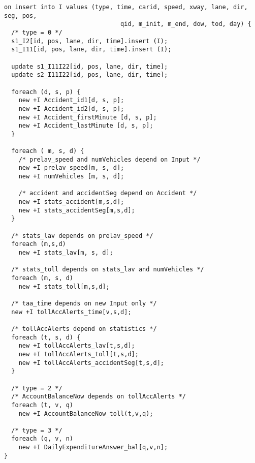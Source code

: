 \pagebreak
\begin{verbatim}
on insert into I values (type, time, carid, speed, xway, lane, dir, seg, pos, 
                                qid, m_init, m_end, dow, tod, day) {
  /* type = 0 */
  s1_I2[id, pos, lane, dir, time].insert (I);
  s1_I11[id, pos, lane, dir, time].insert (I);
  
  update s1_I11I22[id, pos, lane, dir, time];
  update s2_I11I22[id, pos, lane, dir, time];

  foreach (d, s, p) {
    new +I Accident_id1[d, s, p];
    new +I Accident_id2[d, s, p];
    new +I Accident_firstMinute [d, s, p];
    new +I Accident_lastMinute [d, s, p];
  }
  
  foreach ( m, s, d) {
    /* prelav_speed and numVehicles depend on Input */
    new +I prelav_speed[m, s, d];   
    new +I numVehicles [m, s, d];
    
    /* accident and accidentSeg depend on Accident */
    new +I stats_accident[m,s,d];
    new +I stats_accidentSeg[m,s,d];
  }

  /* stats_lav depends on prelav_speed */
  foreach (m,s,d) 
    new +I stats_lav[m, s, d];

  /* stats_toll depends on stats_lav and numVehicles */
  foreach (m, s, d) 
    new +I stats_toll[m,s,d];

  /* taa_time depends on new Input only */  
  new +I tollAccAlerts_time[v,s,d];
  
  /* tollAccAlerts depend on statistics */
  foreach (t, s, d) {
    new +I tollAccAlerts_lav[t,s,d];
    new +I tollAccAlerts_toll[t,s,d];
    new +I tollAccAlerts_accidentSeg[t,s,d];
  }
  
  /* type = 2 */
  /* AccountBalanceNow depends on tollAccAlerts */
  foreach (t, v, q) 
    new +I AccountBalanceNow_toll(t,v,q);
  
  /* type = 3 */
  foreach (q, v, n) 
    new +I DailyExpenditureAnswer_bal[q,v,n];
}
\end{verbatim}
\begin{comment}

\end{comment}